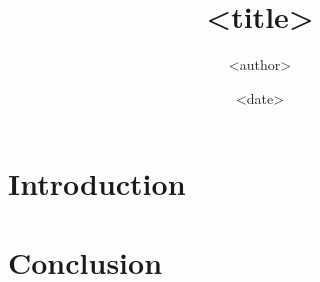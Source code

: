 \documentclass[11pt]{article}
\title{<title>}
\author{<author>}
\date{<date>}
\begin{document}

\begin{titlepage}
  \maketitle
  \vfill
  \tableofcontents
\end{titlepage}

\section*{Introduction} %


\section*{Conclusion} %
\end{document}
